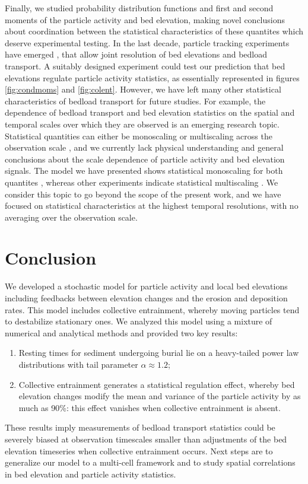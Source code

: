 \documentclass[draft]{agujournal2018}
\begin{document}
Finally, we studied probability distribution functions and first and second moments of the particle activity and bed elevation, making novel conclusions about coordination between the statistical characteristics of these quantites which deserve experimental testing.
In the last decade, particle tracking experiments have emerged \citep{Lajeunesse2010,Roseberry2012,Martin2014, Fathel2015,Heyman2016,Liu2019}, that allow joint resolution of bed elevations and bedload transport. 
A suitably designed experiment could test our prediction that bed elevations regulate particle activity statistics, as essentially represented in figures \ref{fig:condmoms} and \ref{fig:colent}. 
However, we have left many other statistical characteristics of bedload transport for future studies. 
For example, the dependence of bedload transport \citep{Saletti2015a,Singh2009} and bed elevation statistics \citep{Aberle2006, Singh2009,Singh2012} on the spatial and temporal scales over which they are observed is an emerging research topic. Statistical quantities can either be monoscaling or multiscaling across the observation scale \citep{Sornette2000}, and we currently lack physical understanding and general conclusions about the scale dependence of particle activity and bed elevation signals.
The model we have presented shows statistical monoscaling for both quantites \citep[e.g.][]{Saletti2015a}, whereas other experiments indicate statistical multiscaling \citep{Aberle2006,Singh2009,Singh2012}. We consider this topic to go beyond the scope of the present work, and we have focused on statistical characteristics at the highest temporal resolutions, with no averaging over the observation scale.

\section{Conclusion}
\label{sec:conclusion}

We developed a stochastic model for particle activity and local bed elevations including feedbacks between elevation changes and the erosion and deposition rates.
This model includes collective entrainment, whereby moving particles tend to destabilize stationary ones.
We analyzed this model using a mixture of numerical and analytical methods and provided two key results:
\begin{enumerate}
\item Resting times for sediment undergoing burial lie on a heavy-tailed power law distributions with tail parameter $\alpha \approx 1.2$;
\item Collective entrainment generates a statistical regulation effect, whereby bed elevation changes modify the mean and variance of the particle activity by as much as 90\%: this effect vanishes when collective entrainment is absent.
\end{enumerate}
These results imply measurements of bedload transport statistics could be severely biased at observation timescales smaller than adjustments of the bed elevation timeseries when collective entrainment occurs.
Next steps are to generalize our model to a multi-cell framework and to study spatial correlations in bed elevation and particle activity statistics.
\end{document}
